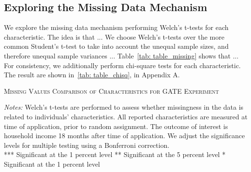 

\subsection{Exploring the Missing Data Mechanism}

We explore the missing data mechanism performing Welch's t-tests for each characteristic. The idea is that ...
We choose Welch's t-tests over the more common Student's t-test to take into account the unequal sample sizes, and therefore unequal sample variances ... %
Table~\ref{tab: table_missing} shows that ...
For consistency, we additionally perform chi-square tests for each characteristic. The result are shown in~\ref{tab: table_chisq}, in Appendix A. %

\begin{table}
\centering
\caption{\textsc{Missing Values Comparison of Characteristics for GATE Experiment}}
\begin{adjustbox}{width=\textwidth,totalheight=\textheight,keepaspectratio}

\end{adjustbox}


\label{tab:table_missing}
\medskip
\raggedright
\footnotesize
\textit{Notes:} Welch's t-tests are performed to assess whether missingness in the data is related to individuals' characteristics.
All reported characteristics are measured at time of application, prior to random assignment. The outcome of interest is household income 18 months after time of application. We adjust the significance levels for multiple testing using a Bonferroni correction. \\
*** Significant at the 1 percent level ** Significant at the 5 percent level * Significant at the 1 percent level
\end{table}

